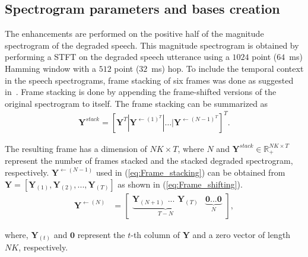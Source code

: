 \subsection{Spectrogram parameters and bases creation}
The enhancements are performed on the positive half of the magnitude spectrogram of the degraded speech. 
This magnitude spectrogram is obtained by performing a STFT on the degraded speech utterance using a $1024$ point ($64$~ms) Hamming window with a $512$ point ($32$~ms) hop. To include the temporal context in the speech spectrograms, frame stacking of six frames was done as suggested in~\cite{mohammadiha2016speech}. Frame stacking is done by appending the frame-shifted versions of the original spectrogram to itself. The frame stacking can be summarized as
\begin{align}
\mathbf{Y}^{stack} = [\mathbf{Y}^T| \mathbf{Y}^{\leftarrow (1)^T} | \dots |\mathbf{Y}^{\leftarrow (N-1)^T}]^T.
\label{eq:Frame_stacking}
\end{align}

The resulting frame has a dimension of $NK \times T$, where $N$ and $\mathbf{Y}^{stack} \in \mathbb{R}_+^{NK \times T}$ represent the number of frames stacked and the stacked degraded spectrogram, respectively. $\mathbf{Y}^{\leftarrow (N-1)}$ used in (\ref{eq:Frame_stacking}) can be obtained from $\mathbf{Y}=[\mathbf{Y}_{(1)}, \mathbf{Y}_{(2)}, ...,\mathbf{Y}_{(T)}]$ as shown in (\ref{eq:Frame_shifting}).
\begin{align}
\mathbf{Y}^{\leftarrow (N)} &= \begin{bmatrix}
\underbrace{\mathbf{Y}_{(N+1)} \text{ ... } \mathbf{Y}_{(T)}}_{T-N} & \underbrace{\mathbf{0}\text{...} \mathbf{0}}_{N}
\end{bmatrix},
\label{eq:Frame_shifting}
\end{align}

where, $\mathbf{Y}_{(t)}$ and $\mathbf{0}$ represent the $t$-th column of $\mathbf{Y}$ and a zero vector of length $NK$, respectively.

